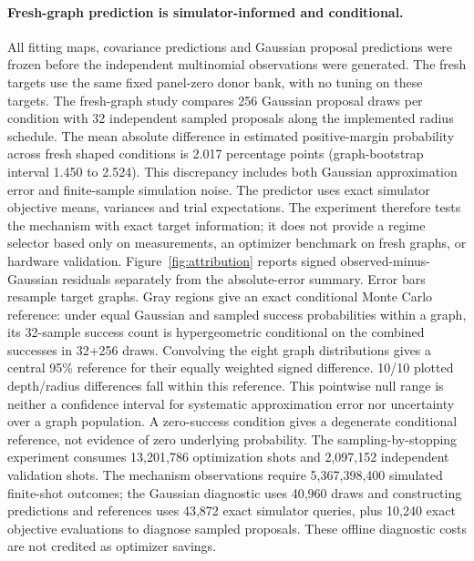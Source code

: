 {\paragraph{Fresh-graph prediction is simulator-informed and conditional.}
All fitting maps, covariance predictions and Gaussian proposal predictions were frozen before the independent multinomial observations were generated. The fresh targets use the same fixed panel-zero donor bank, with no tuning on these targets. The fresh-graph study compares 256 Gaussian proposal draws per condition with 32 independent sampled proposals along the implemented radius schedule. The mean absolute difference in estimated positive-margin probability across fresh shaped conditions is 2.017 percentage points (graph-bootstrap interval 1.450 to 2.524). This discrepancy includes both Gaussian approximation error and finite-sample simulation noise. The predictor uses exact simulator objective means, variances and trial expectations. The experiment therefore tests the mechanism with exact target information; it does not provide a regime selector based only on measurements, an optimizer benchmark on fresh graphs, or hardware validation.
Figure~\ref{fig:attribution} reports signed observed-minus-Gaussian residuals separately from the absolute-error summary. Error bars resample target graphs. Gray regions give an exact conditional Monte Carlo reference: under equal Gaussian and sampled success probabilities within a graph, its 32-sample success count is hypergeometric conditional on the combined successes in 32+256 draws. Convolving the eight graph distributions gives a central 95\% reference for their equally weighted signed difference. 10/10 plotted depth/radius differences fall within this reference. This pointwise null range is neither a confidence interval for systematic approximation error nor uncertainty over a graph population. A zero-success condition gives a degenerate conditional reference, not evidence of zero underlying probability.
The sampling-by-stopping experiment consumes 13,201,786 optimization shots and 2,097,152 independent validation shots. The mechanism observations require 5,367,398,400 simulated finite-shot outcomes; the Gaussian diagnostic uses 40,960 draws and constructing predictions and references uses 43,872 exact simulator queries, plus 10,240 exact objective evaluations to diagnose sampled proposals. These offline diagnostic costs are not credited as optimizer savings.
}
